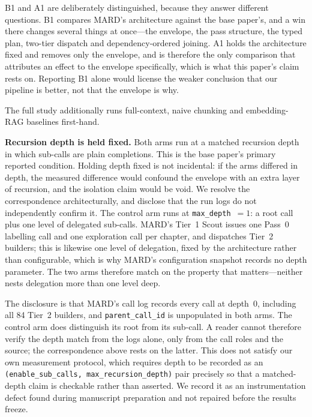 \documentclass[conference]{IEEEtran}
\begin{document}
B1 and A1 are deliberately distinguished, because they answer different
questions. B1 compares MARD's architecture against the base paper's, and a
win there changes several things at once---the envelope, the pass structure,
the typed plan, two-tier dispatch and dependency-ordered joining. A1 holds
the architecture fixed and removes only the envelope, and is therefore the
only comparison that attributes an effect to the envelope specifically, which
is what this paper's claim rests on. Reporting B1 alone would license the
weaker conclusion that our pipeline is better, not that the envelope is why.

The full study additionally runs full-context, naive chunking and
embedding-RAG baselines first-hand.

\noindent\textbf{Recursion depth is held fixed.}
Both arms run at a matched recursion depth in which sub-calls are plain
completions. This is the base paper's primary reported condition. Holding
depth fixed is not incidental: if the arms differed in depth, the measured
difference would confound the envelope with an extra layer of recursion, and
the isolation claim would be void.
We resolve the correspondence architecturally, and disclose that the run logs
do not independently confirm it. The control arm runs at
\texttt{max\_depth}~$=1$: a root call plus one level of delegated sub-calls.
MARD's Tier~1 Scout issues one Pass~0 labelling call and one exploration call
per chapter, and dispatches Tier~2 builders; this is likewise one level of
delegation, fixed by the architecture rather than configurable, which is why
MARD's configuration snapshot records no depth parameter. The two arms
therefore match on the property that matters---neither nests delegation more
than one level deep.

The disclosure is that MARD's call log records every call at depth~\num{0},
including all \num{84} Tier~2 builders, and \texttt{parent\_call\_id} is
unpopulated in both arms. The control arm does distinguish its root from its
sub-call. A reader cannot therefore verify the depth match from the logs alone,
only from the call roles and the source; the correspondence above rests on the
latter. This does not satisfy our own measurement protocol, which requires
depth to be recorded as an \texttt{(enable\_sub\_calls,
max\_recursion\_depth)} pair precisely so that a matched-depth claim is
checkable rather than asserted. We record it as an instrumentation defect
found during manuscript preparation and not repaired before the results
freeze.
\end{document}

